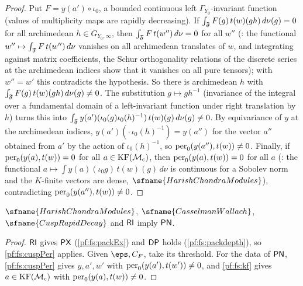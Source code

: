 \begin{proof}
Put $F=y(a')\circ\iota_0$, a bounded continuous left $\Gamma_{Y_0}$-invariant function (values of multiplicity maps are rapidly
decreasing). If $\int_{\mathfrak F}F(g)\,t(w)(gh)\,d\nu(g)=0$ for all archimedean $h\in G_{Y_0,\infty}$, then
$\int_\mathfrak F F\,t(w'')\,d\nu=0$ for all $w''$ (: the
functional $w''\mapsto\int_\mathfrak F F\,t(w'')\,d\nu$ vanishes on all archimedean translates of $w$, and integrating against matrix
coefficients, the Schur orthogonality relations of the discrete series at the archimedean indices show that it vanishes on all
pure tensors); with $w''=w'$ this contradicts the hypothesis. So there is archimedean $h$ with
$\int_\mathfrak F F(g)\,t(w)(gh)\,d\nu(g)\ne0$. The substitution $g\mapsto gh^{-1}$ (invariance of the integral over a fundamental domain
of a left-invariant function under right translation by $h$) turns this into
$\int_\mathfrak F y(a')(\iota_0(g)\iota_0(h)^{-1})\,t(w)(g)\,d\nu(g)\ne0$. By equivariance of $y$ at the archimedean indices,
$y(a')(\cdot\,\iota_0(h)^{-1})=y(a'')$ for the vector $a''$ obtained from $a'$ by the action of $\iota_0(h)^{-1}$, so
$\mathrm{per}_0(y(a''),t(w))\ne0$. Finally, if $\mathrm{per}_0(y(a),t(w))=0$ for all $a\in\mathrm{KF}(\mathcal M_{\mathrm{c}})$, then
$\mathrm{per}_0(y(a),t(w))=0$ for all $a$ (: the functional
$a\mapsto\int y(a)(\iota_0g)\,t(w)(g)\,d\nu$ is continuous for a Sobolev norm and the $K$-finite vectors are dense,
$\sfname{HarishChandraModules}$), contradicting $\mathrm{per}_0(y(a''),t(w))\ne0$.
\end{proof}

\begin{theorem}\label{pf:fs:periodNe}
$\sfname{HarishChandraModules}$, $\sfname{CasselmanWallach}$, $\sfname{CuspRapidDecay}$ and $\mathsf{RI}$ imply $\mathsf{PN}$.
\end{theorem}

\begin{proof}
$\mathsf{RI}$ gives $\mathsf{PX}$ (\cref{pf:fs:packEx}) and $\mathsf{DP}$ holds (\cref{pf:fs:packdepth}), so \cref{pf:fs:cuspPer} applies. Given $\eps,C_F$, take its
threshold. For the data of $\mathsf{PN}$, \cref{pf:fs:cuspPer} gives $y,a',w'$ with $\mathrm{per}_0(y(a'),t(w'))\ne0$, and \cref{pf:fs:kf} gives
$a\in\mathrm{KF}(\mathcal M_{\mathrm{c}})$ with $\mathrm{per}_0(y(a),t(w))\ne0$.
\end{proof}

